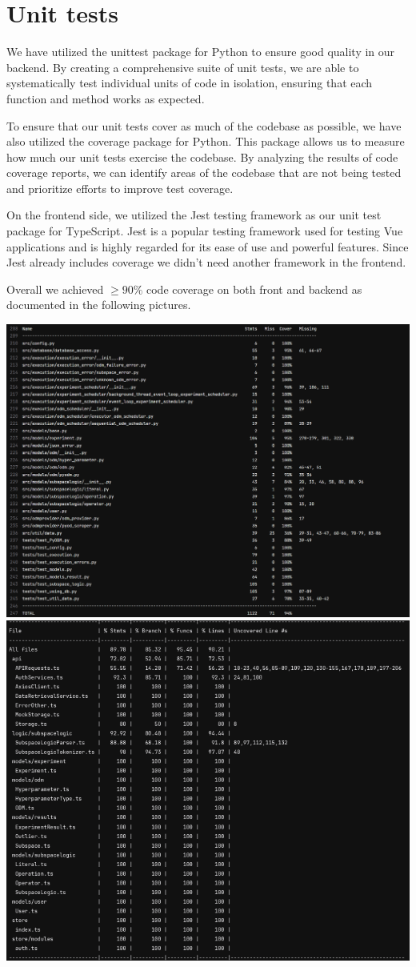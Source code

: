 \section{Unit tests}

We have utilized the unittest package for Python to ensure good quality in our backend. By creating a comprehensive suite of unit tests, we are able to systematically test individual units of code in isolation, ensuring that each function and method works as expected. 

To ensure that our unit tests cover as much of the codebase as possible, we have also utilized the coverage package for Python. This package allows us to measure how much our unit tests exercise the codebase. By analyzing the results of code coverage reports, we can identify areas of the codebase that are not being tested and prioritize efforts to improve test coverage.

On the frontend side, we utilized the Jest testing framework as our unit test package for TypeScript. Jest is a popular testing framework used for testing Vue applications and is highly regarded for its ease of use and powerful features. Since Jest already includes coverage we didn't need another framework in the frontend.

Overall we achieved $\geq 90 \%$ code coverage on both front and backend as documented in the following pictures. 

\includegraphics[width=1\textwidth]{images/backend.png}
\includegraphics[width=1\textwidth]{images/frontend.png}
